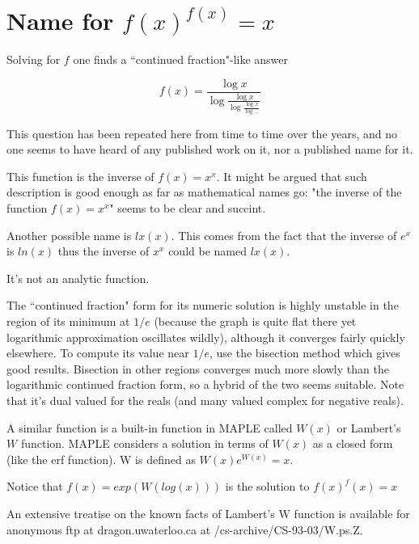 \section{Name for $f(x)^{f(x)}=x$}


    Solving for $f$ one finds a ``continued fraction"-like answer


               \begin{equation}
            f(x) = \frac{\log x}{\log
                     \frac{\log x}{\log
                      \frac{\log x}{\log\ldots } } }
\end{equation}


 This question has been repeated here from time to time over the
    years, and no one seems to have heard of any published work on it,
    nor a published name for it. 


This function is the inverse of $f(x)=x^x$. It might be argued that
such description is good enough as far as mathematical names go: 
"the inverse of the function $f(x)=x^x$" seems to be clear and succint.

Another possible name is $lx(x)$. This comes from the fact that
the inverse of $e^x$ is $ln(x)$ thus the inverse of $x^x$ could be
named $lx(x)$.




It's not an analytic function.

    The ``continued fraction" form for its numeric solution is highly
    unstable in the region of its minimum at $1/e$ (because the graph is
    quite flat there yet logarithmic approximation oscillates wildly),
    although it converges fairly quickly elsewhere. To compute its value
    near $1/e$, use the bisection method which gives good results. Bisection
    in other regions converges much more slowly than the logarithmic
    continued fraction form, so a hybrid of the two seems suitable.
    Note that it's dual valued for the reals (and many valued complex
    for negative reals).

    A similar function is a built-in function in MAPLE called $W(x)$
 or Lambert's $W$ function.
    MAPLE considers a solution in terms of $W(x)$ as a closed form (like
    the erf function). W is defined as $W(x)e^{W(x)}=x$.

    Notice that $f(x) = exp(W(log(x)))$ is the solution to $f(x)^f(x)=x$

    An extensive treatise on the known facts of Lambert's W function
    is available for anonymous ftp at dragon.uwaterloo.ca at
    /cs-archive/CS-93-03/W.ps.Z.


